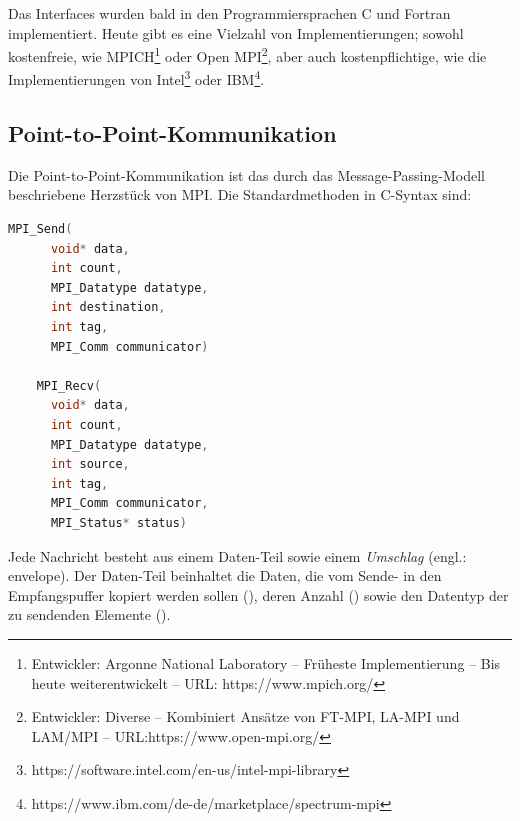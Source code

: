       Das Interfaces wurden bald in den Programmiersprachen C und Fortran implementiert. Heute gibt es eine Vielzahl von Implementierungen; sowohl kostenfreie, wie  
      MPICH\footnote{Entwickler: Argonne National Laboratory -- Früheste Implementierung -- Bis heute weiterentwickelt -- URL: https://www.mpich.org/} oder
      Open MPI\footnote{Entwickler: Diverse -- Kombiniert Ansätze von FT-MPI, LA-MPI und LAM/MPI -- URL:https://www.open-mpi.org/},
      aber auch kostenpflichtige, wie die Implementierungen von Intel\footnote{https://software.intel.com/en-us/intel-mpi-library} oder IBM\footnote{https://www.ibm.com/de-de/marketplace/spectrum-mpi}. 
      
    \subsection{Point-to-Point-Kommunikation}
    \label{sec:ptpkom}
    Die Point-to-Point-Kommunikation ist das durch das Message-Passing-Modell beschriebene Herzstück von MPI.  
    Die Standardmethoden in C-Syntax sind:
    \begin{lstlisting}[language=C, label=lst:p2p_standard, caption={Die Syntax der standard Sende- und Empfangsoperationen}, numbers=none]
	MPI_Send(
	  void* data,
	  int count,
	  MPI_Datatype datatype,
	  int destination,
	  int tag,
	  MPI_Comm communicator)

	MPI_Recv(
	  void* data,
	  int count,
	  MPI_Datatype datatype,
	  int source,
	  int tag,
	  MPI_Comm communicator,
	  MPI_Status* status)

    \end{lstlisting}
    
    Jede Nachricht besteht aus einem Daten-Teil sowie einem \textit{Umschlag} (engl.: envelope). Der Daten-Teil beinhaltet die Daten, die vom Sende- in den Empfangspuffer kopiert
    werden sollen (), deren Anzahl () sowie den Datentyp der zu sendenden Elemente (). \citep{mpiv31}
    
